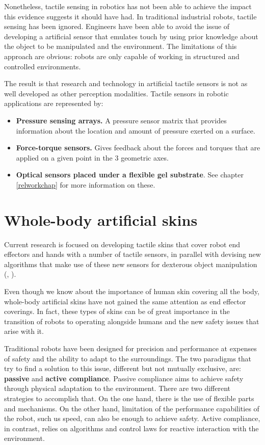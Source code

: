 Nonetheless, tactile sensing in robotics has not been able to achieve the impact this evidence suggests it should have had. In traditional industrial robots, tactile sensing has been ignored. Engineers have been able to avoid the issue of developing a artificial sensor that emulates touch by using prior knowledge about the object to be manipulated and the environment. The limitations of this approach are obvious: robots are only capable of working in structured and controlled environments.

The result is that research and technology in artificial tactile sensors is not as well developed as other perception modalities. Tactile sensors in robotic applications are represented by:

\begin{itemize}
    \item\textbf{Pressure sensing arrays.} A pressure sensor matrix that provides information about the location and amount of pressure exerted on a surface.
    \item\textbf{Force-torque sensors.} Gives feedback about the forces and torques that are applied on a given point in the 3 geometric axes.
    \item\textbf{Optical sensors placed under a flexible gel substrate}. See chapter \ref{relworkchap} for more information on these.
\end{itemize}

\section{Whole-body artificial skins}
Current research is focused on developing tactile skins that cover robot end effectors and hands with a number of tactile sensors, in parallel with devising new algorithms that make use of these new sensors for dexterous object manipulation (\cite{tianFeel}, \cite{wilson2020design}).

Even though we know about the importance of human skin covering all the body, whole-body artificial skins have not gained the same attention as end effector coverings. In fact, these types of skins can be of great importance in the transition of robots to operating alongside humans and the new safety issues that arise with it.

Traditional robots have been designed for precision and performance at expenses of safety and the ability to adapt to the surroundings. The two paradigms that try to find a solution to this issue, different but not mutually exclusive, are: \textbf{passive} and \textbf{active compliance}. Passive compliance aims to achieve safety through physical adaptation to the environment. There are two different strategies to accomplish that. On the one hand, there is the use of flexible parts and mechanisms. On the other hand, limitation of the performance capabilities of the robot, such us speed, can also be enough to achieve safety. Active compliance, in contrast, relies on algorithms and control laws for reactive interaction with the environment.

